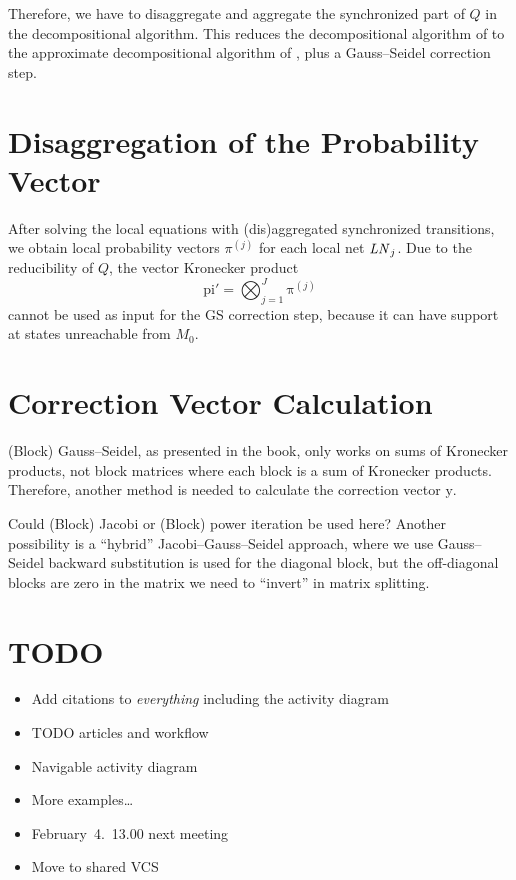 \documentclass[a4paper,10pt,twoside,openright]{memoir}
\newcommand*{\LN}{\textnormal{\emph{LN}}}
\renewcommand*{\vec}[1]{\boldsymbol{\mathrm{#1}}}
\begin{document}
Therefore, we have to disaggregate and aggregate the synchronized part
of $Q$ in the decompositional algorithm. This reduces the
decompositional algorithm of \citet{bao2008decompositional} to the
approximate decompositional algorithm of
\citet{DBLP:journals/sigmetrics/BuchholzK98}, plus a Gauss--Seidel
correction step.

\section{Disaggregation of the Probability Vector}

After solving the local equations with (dis)aggregated synchronized
transitions, we obtain local probability vectors $\pi^{(j)}$ for each
local net $\LN_j$. Due to the reducibility of $Q$, the
vector Kronecker product
\begin{equation}
  \vec{pi}' = \bigotimes_{j = 1}^J \vec{\pi}^{(j)}
\end{equation}
cannot be used as input for the GS correction step, because it can
have support at states unreachable from $M_0$.

\section{Correction Vector Calculation}

(Block) Gauss--Seidel, as presented in the book, only works on sums of
Kronecker products, not block matrices where each block is a sum of
Kronecker products. Therefore, another method is needed to calculate
the correction vector $\vec{y}$.

Could (Block) Jacobi or (Block) power iteration \citep[Section
3.2]{dayar2012analyzing} be used here? Another possibility is a
``hybrid'' Jacobi--Gauss--Seidel approach, where we use Gauss--Seidel
backward substitution is used for the diagonal block, but the
off-diagonal blocks are zero in the matrix we need to ``invert'' in
matrix splitting.

\section{TODO}

\begin{itemize}
\item Add citations to \emph{everything} including the activity
  diagram
\item TODO articles and workflow
\item Navigable activity diagram
\item More examples\ldots
\item February~4.~13.00 next meeting
\item Move to shared VCS
\end{itemize}

\backmatter

\printbibliography
\end{document}
